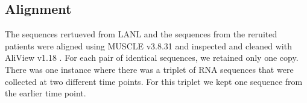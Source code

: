 \documentclass[12pt,onecolumn,twoside]{pnas-new}
\begin{document}
{\subsection*{Alignment}
The sequences rertueved from LANL and the sequences from the reruited patients were aligned using MUSCLE v3.8.31 \cite{muscle} and inspected and cleaned with AliView v1.18 \cite{aliview}.
For each pair of identical sequences, we retained only one copy.
There was one instance where there was a triplet of RNA sequences that were collected at two different time points.
For this triplet we kept one sequence from the earlier time point.
}
\end{document}
